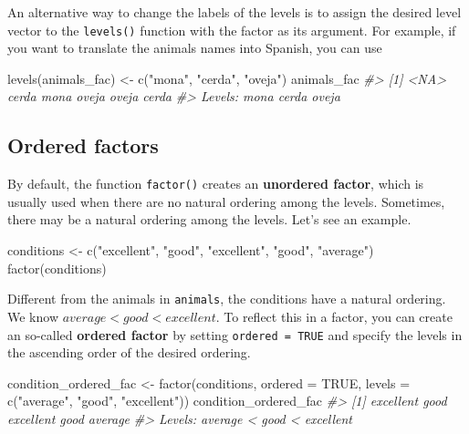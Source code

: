 \documentclass[
]{book}
\newenvironment{Shaded}{\begin{snugshade}}{\end{snugshade}}
\newcommand{\AttributeTok}[1]{\textcolor[rgb]{0.77,0.63,0.00}{#1}}
\newcommand{\CommentTok}[1]{\textcolor[rgb]{0.56,0.35,0.01}{\textit{#1}}}
\newcommand{\ConstantTok}[1]{\textcolor[rgb]{0.00,0.00,0.00}{#1}}
\newcommand{\FunctionTok}[1]{\textcolor[rgb]{0.00,0.00,0.00}{#1}}
\newcommand{\NormalTok}[1]{#1}
\newcommand{\OtherTok}[1]{\textcolor[rgb]{0.56,0.35,0.01}{#1}}
\newcommand{\StringTok}[1]{\textcolor[rgb]{0.31,0.60,0.02}{#1}}
\begin{document}
An alternative way to change the labels of the levels is to assign the desired level vector to the \texttt{levels()} function with the factor as its argument. For example, if you want to translate the animals names into Spanish, you can use

\begin{Shaded}
\begin{Highlighting}[]
\FunctionTok{levels}\NormalTok{(animals\_fac) }\OtherTok{\textless{}{-}} \FunctionTok{c}\NormalTok{(}\StringTok{"mona"}\NormalTok{, }\StringTok{"cerda"}\NormalTok{, }\StringTok{"oveja"}\NormalTok{)}
\NormalTok{animals\_fac}
\CommentTok{\#\textgreater{} [1] \textless{}NA\textgreater{}  cerda mona  oveja oveja cerda}
\CommentTok{\#\textgreater{} Levels: mona cerda oveja}
\end{Highlighting}
\end{Shaded}

\hypertarget{ordered-factors}{%
\subsection{Ordered factors}\label{ordered-factors}}

By default, the function \texttt{factor()} creates an \textbf{unordered factor}, which is usually used when there are no natural ordering among the levels. Sometimes, there may be a natural ordering among the levels. Let's see an example.

\begin{Shaded}
\begin{Highlighting}[]
\NormalTok{conditions }\OtherTok{\textless{}{-}} \FunctionTok{c}\NormalTok{(}\StringTok{"excellent"}\NormalTok{, }\StringTok{"good"}\NormalTok{, }\StringTok{"excellent"}\NormalTok{, }\StringTok{"good"}\NormalTok{, }\StringTok{"average"}\NormalTok{)}
\FunctionTok{factor}\NormalTok{(conditions)}
\end{Highlighting}
\end{Shaded}

Different from the animals in \texttt{animals}, the conditions have a natural ordering. We know \(average < good < excellent\). To reflect this in a factor, you can create an so-called \textbf{ordered factor} by setting \texttt{ordered\ =\ TRUE} and specify the levels in the ascending order of the desired ordering.

\begin{Shaded}
\begin{Highlighting}[]
\NormalTok{condition\_ordered\_fac }\OtherTok{\textless{}{-}} \FunctionTok{factor}\NormalTok{(conditions, }\AttributeTok{ordered =} \ConstantTok{TRUE}\NormalTok{, }\AttributeTok{levels =} \FunctionTok{c}\NormalTok{(}\StringTok{"average"}\NormalTok{, }\StringTok{"good"}\NormalTok{, }\StringTok{"excellent"}\NormalTok{))}
\NormalTok{condition\_ordered\_fac}
\CommentTok{\#\textgreater{} [1] excellent good      excellent good      average  }
\CommentTok{\#\textgreater{} Levels: average \textless{} good \textless{} excellent}
\end{Highlighting}
\end{Shaded}
\end{document}
